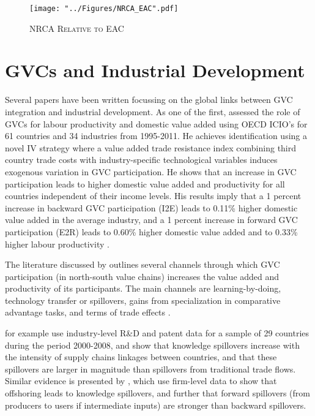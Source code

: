\documentclass[a4paper]{article}
\begin{document}
\begin{figure}[h!]
\centering
\caption{\label{fig:NRCA_EAC}\textsc{NRCA Relative to EAC}}
\texttt{[image: "../Figures/NRCA\_EAC".pdf]} %
\end{figure}
\FloatBarrier



\section{GVCs and Industrial Development}
Several papers have been written focussing on the global links between GVC integration and industrial development. As one of the first, \citet{Kummritz20161} assessed the role of GVCs for labour productivity and domestic value added using OECD ICIO's for 61 countries and 34 industries from 1995-2011. He achieves identification using a novel IV strategy where a value added trade resistance index combining third country trade costs with industry-specific technological variables induces exogenous variation in GVC participation. He shows that an increase in GVC participation leads to higher domestic value added and productivity for all countries independent of their income levels. His results imply that a 1 percent increase in backward GVC participation (I2E) leads to 0.11\% higher domestic value added in the average industry, and  a 1 percent increase in forward GVC participation (E2R) leads to 0.60\% higher domestic value added and to 0.33\% higher labour productivity \citep{Kummritz20161}. \newline


The literature discussed by \citet{Kummritz20161} outlines several channels through which GVC participation (in north-south value chains) increases the value added and productivity of its participants. The main channels are learning-by-doing, technology transfer or spillovers, gains from specialization in comparative advantage tasks, and terms of trade effects  \citep{Kummritz20161}. \newline

\citet{piermartini2014knowledge} for example use industry-level R\&D and patent data for a sample of 29 countries during the period 2000-2008, and show that knowledge spillovers increase with the intensity of supply chains linkages between countries, and that these spillovers are larger in magnitude than spillovers from traditional trade flows. Similar evidence is presented by \citet{benz2015trade}, which use firm-level data to show that offshoring leads to knowledge spillovers, and further that forward spillovers (from producers to users if intermediate inputs) are stronger than backward spillovers. \newline
\end{document}
